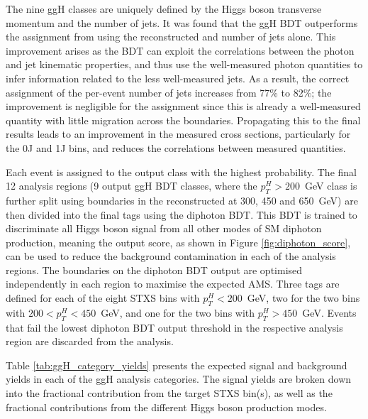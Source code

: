 The nine ggH classes are uniquely defined by the Higgs boson transverse momentum and the number of jets. It was found that the ggH BDT outperforms the assignment from using the reconstructed \ptgg and number of jets alone. This improvement arises as the BDT can exploit the correlations between the photon and jet kinematic properties, and thus use the well-measured photon quantities to infer information related to the less well-measured jets. As a result, the correct assignment of the per-event number of jets increases from 77\% to 82\%; the improvement is negligible for the \ptgg assignment since this is already a well-measured quantity with little migration across the \ptH boundaries. Propagating this to the final results leads to an improvement in the measured cross sections, particularly for the 0J and 1J bins, and reduces the correlations between measured quantities.

Each event is assigned to the output class with the highest probability. The final 12 analysis regions (9 output ggH BDT classes, where the $p_T^H>200$~GeV class is further split using boundaries in the reconstructed \ptgg at 300, 450 and 650~GeV) are then divided into the final tags using the diphoton BDT. This BDT is trained to discriminate all Higgs boson signal from all other modes of SM diphoton production, meaning the output score, as shown in Figure \ref{fig:diphoton_score}, can be used to reduce the background contamination in each of the analysis regions. The boundaries on the diphoton BDT output are optimised independently in each region to maximise the expected AMS. Three tags are defined for each of the eight STXS bins with $p_T^H<200$~GeV, two for the two bins with $200<p_T^H<450$~GeV, and one for the two bins with $p_T^H>450$~GeV. Events that fail the lowest diphoton BDT output threshold in the respective analysis region are discarded from the analysis. 

Table \ref{tab:ggH_category_yields} presents the expected signal and background yields in each of the ggH analysis categories. The signal yields are broken down into the fractional contribution from the target STXS bin(s), as well as the fractional contributions from the different Higgs boson production modes.

